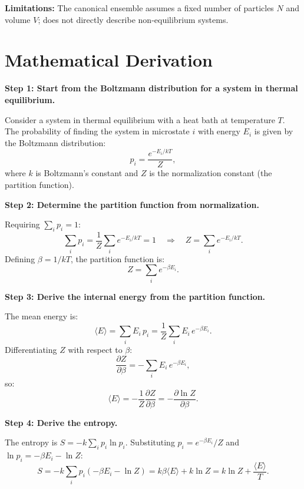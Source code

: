 \textbf{Limitations:} The canonical ensemble assumes a fixed number of particles $N$ and volume $V$; does not directly describe non-equilibrium systems.


\section*{Mathematical Derivation}

\textbf{Step 1: Start from the Boltzmann distribution for a system in thermal equilibrium.}

Consider a system in thermal equilibrium with a heat bath at temperature $T$. The probability of finding the system in microstate $i$ with energy $E_i$ is given by the Boltzmann distribution:
\begin{equation}
p_i = \frac{e^{-E_i/kT}}{Z},
\end{equation}
where $k$ is Boltzmann's constant and $Z$ is the normalization constant (the partition function).

\textbf{Step 2: Determine the partition function from normalization.}

Requiring $\sum_i p_i = 1$:
\begin{equation}
\sum_i p_i = \frac{1}{Z}\sum_i e^{-E_i/kT} = 1 \quad\Longrightarrow\quad Z = \sum_i e^{-E_i/kT}.
\end{equation}
Defining $\beta = 1/kT$, the partition function is:
\begin{equation}
\boxed{Z = \sum_i e^{-\beta E_i}.}
\end{equation}

\textbf{Step 3: Derive the internal energy from the partition function.}

The mean energy is:
\begin{equation}
\langle E \rangle = \sum_i E_i\,p_i = \frac{1}{Z}\sum_i E_i\,e^{-\beta E_i}.
\end{equation}
Differentiating $Z$ with respect to $\beta$:
\begin{equation}
\frac{\partial Z}{\partial \beta} = -\sum_i E_i\,e^{-\beta E_i},
\end{equation}
so:
\begin{equation}
\langle E \rangle = -\frac{1}{Z}\frac{\partial Z}{\partial \beta} = -\frac{\partial \ln Z}{\partial \beta}.
\end{equation}

\textbf{Step 4: Derive the entropy.}

The entropy is $S = -k\sum_i p_i \ln p_i$. Substituting $p_i = e^{-\beta E_i}/Z$ and $\ln p_i = -\beta E_i - \ln Z$:
\begin{equation}
S = -k\sum_i p_i(-\beta E_i - \ln Z) = k\beta\langle E\rangle + k\ln Z = k\ln Z + \frac{\langle E\rangle}{T}.
\end{equation}

